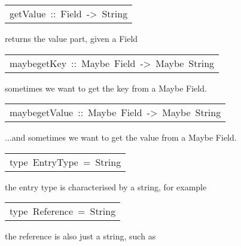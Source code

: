 \begin{haddockdesc}
\item[\begin{tabular}{@{}l}
getValue\ ::\ Field\ ->\ String
\end{tabular}]\haddockbegindoc
returns the value part, given a Field
\par

\end{haddockdesc}
\begin{haddockdesc}
\item[\begin{tabular}{@{}l}
maybegetKey\ ::\ Maybe\ Field\ ->\ Maybe\ String
\end{tabular}]\haddockbegindoc
sometimes we want to get the key from a Maybe Field. 
\par

\end{haddockdesc}
\begin{haddockdesc}
\item[\begin{tabular}{@{}l}
maybegetValue\ ::\ Maybe\ Field\ ->\ Maybe\ String
\end{tabular}]\haddockbegindoc
...and sometimes we want to get the value from a Maybe Field. 
\par

\end{haddockdesc}
\begin{haddockdesc}
\item[\begin{tabular}{@{}l}
type\ EntryType\ =\ String
\end{tabular}]\haddockbegindoc
the entry type is characterised by a string, for example 
\par

\end{haddockdesc}
\begin{haddockdesc}
\item[\begin{tabular}{@{}l}
type\ Reference\ =\ String
\end{tabular}]\haddockbegindoc
the reference is also just a string, such as 
\par

\end{haddockdesc}

